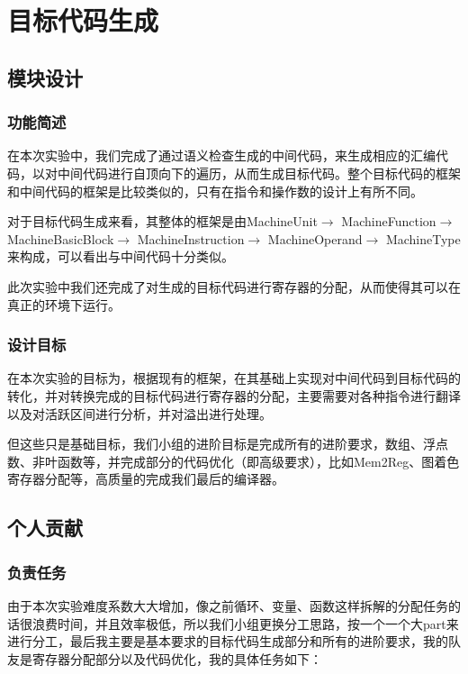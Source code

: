 \documentclass[UTF8,a4paper,10pt]{ctexart}
\begin{document}
\newpage

\section{目标代码生成}
\subsection{模块设计}
\subsubsection{功能简述}
在本次实验中，我们完成了通过语义检查生成的中间代码，来生成相应的汇编代码，以对中间代码进行自顶向下的遍历，从而生成目标代码。整个目标代码的框架和中间代码的框架是比较类似的，只有在指令和操作数的设计上有所不同。

对于目标代码生成来看，其整体的框架是由MachineUnit$\rightarrow$
MachineFunction$\rightarrow$
MachineBasicBlock$\rightarrow$
MachineInstruction$\rightarrow$
MachineOperand$\rightarrow$
MachineType来构成，可以看出与中间代码十分类似。

此次实验中我们还完成了对生成的目标代码进行寄存器的分配，从而使得其可以在真正的环境下运行。
\subsubsection{设计目标}
在本次实验的目标为，根据现有的框架，在其基础上实现对中间代码到目标代码的转化，并对转换完成的目标代码进行寄存器的分配\cite{bl}，主要需要对各种指令进行翻译以及对活跃区间进行分析，并对溢出进行处理。

但这些只是基础目标，我们小组的进阶目标是完成所有的进阶要求，数组、浮点数、非叶函数等，并完成部分的代码优化（即高级要求），比如Mem2Reg、图着色寄存器分配等，高质量的完成我们最后的编译器。
\subsection{个人贡献}
\subsubsection{负责任务}
由于本次实验难度系数大大增加，像之前循环、变量、函数这样拆解的分配任务的话很浪费时间，并且效率极低，所以我们小组更换分工思路，按一个一个大part来进行分工，最后我主要是基本要求的目标代码生成部分和所有的进阶要求，我的队友是寄存器分配部分以及代码优化，我的具体任务如下：
\end{document}
